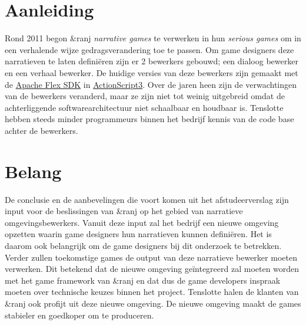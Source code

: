 \documentclass{report}
\newcommand{\organisation}{\&ranj }
\begin{document}
\section{Aanleiding}

Rond 2011 begon \organisation \emph{narrative games} te verwerken in hun \emph{serious games} om in een verhalende wijze gedragsverandering toe te passen. Om game designers deze narratieven te laten defini{\"e}ren zijn er 2 bewerkers gebouwd; een dialoog bewerker en een verhaal bewerker. De huidige versies van deze bewerkers zijn gemaakt met de \href{https://en.wikipedia.org/wiki/Apache_Flex}{Apache Flex SDK} in \href{http://www.adobe.com/devnet/actionscript/articles/actionscript3_overview.html}{ActionScript3}.
Over de jaren heen zijn de verwachtingen van de bewerkers veranderd, maar ze zijn niet tot weinig uitgebreid omdat de achterliggende softwarearchitectuur niet schaalbaar en houdbaar is. Tenslotte hebben steeds minder programmeurs binnen het bedrijf kennis van de code base achter de bewerkers.

\section{Belang}
De conclusie en de aanbevelingen die voort komen uit het afstudeerverslag zijn input voor de beslissingen van \organisation op het gebied van narratieve omgevingsbewerkers. Vanuit deze input zal het bedrijf een nieuwe omgeving opzetten waarin game designers hun narratieven kunnen defini{\"e}ren. Het is daarom ook belangrijk om de game designers bij dit onderzoek te betrekken. Verder zullen toekomstige games de output van deze narratieve bewerker moeten verwerken. Dit betekend dat de nieuwe omgeving ge{\"i}ntegreerd zal moeten worden met het game framework van \organisation en dat dus de game developers inspraak moeten over technische keuzes binnen het project. Tenslotte halen de klanten van \organisation ook profijt uit deze nieuwe omgeving. De nieuwe omgeving maakt de games stabieler en goedkoper om te produceren.
\end{document}
